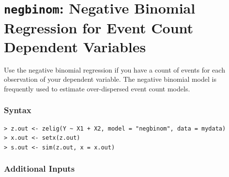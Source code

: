 

\usepackage{Sweave}

\nobibliography*



\section{{\tt negbinom}: Negative Binomial Regression for Event
Count Dependent Variables}\label{negbinom}

Use the negative binomial regression if you have a count of events for
each observation of your dependent variable.  The negative binomial
model is frequently used to estimate over-dispersed event count
models.

\subsubsection{Syntax}

\begin{verbatim}
> z.out <- zelig(Y ~ X1 + X2, model = "negbinom", data = mydata)
> x.out <- setx(z.out)
> s.out <- sim(z.out, x = x.out)
\end{verbatim}

\subsubsection{Additional Inputs} 

